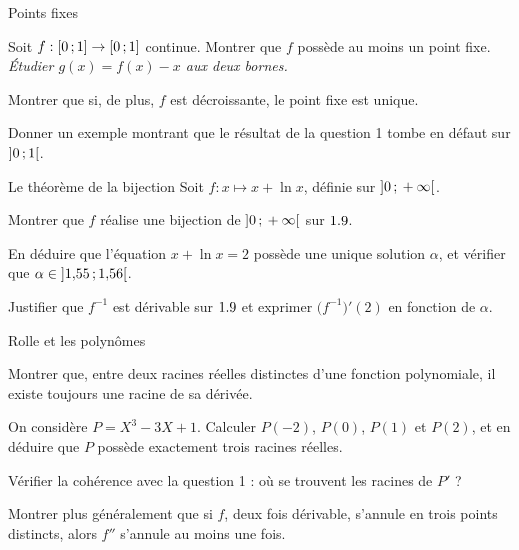\begin{exercice}[2]{Points fixes}
\begin{questions}
  \item Soit $f:\mathopen{[}0\,{;}\,1\mathclose{]}\to\mathopen{[}0\,{;}\,1\mathclose{]}$ continue. Montrer que $f$
    possède au moins un point fixe.
    \emph{Étudier $g(x)=f(x)-x$ aux deux bornes.}
  \item Montrer que si, de plus, $f$ est décroissante, le point fixe est
    unique.
  \item Donner un exemple montrant que le résultat de la question 1 tombe
    en défaut sur $\mathopen{]}0\,{;}\,1\mathclose{[}$.
\end{questions}
\end{exercice}

\begin{exercice}[2]{Le théorème de la bijection}
Soit $f:x\mapsto x+\ln x$, définie sur $\mathopen{]}0\,{;}\,+\infty\mathclose{[}$.
\begin{questions}
  \item Montrer que $f$ réalise une bijection de $\mathopen{]}0\,{;}\,+\infty\mathclose{[}$ sur
    $1.9$.
  \item En déduire que l'équation $x+\ln x=2$ possède une unique solution
    $\alpha$, et vérifier que $\alpha\in\mathopen{]}1{,}55\,{;}\,1{,}56\mathclose{[}$.
  \item Justifier que $f^{-1}$ est dérivable sur $1.9$ et exprimer
    $\bigl(f^{-1}\bigr)'(2)$ en fonction de $\alpha$.
\end{questions}
\end{exercice}

\begin{exercice}[2]{Rolle et les polynômes}
\begin{questions}
  \item Montrer que, entre deux racines réelles distinctes d'une fonction
    polynomiale, il existe toujours une racine de sa dérivée.
  \item On considère $P=X^{3}-3X+1$. Calculer $P(-2)$, $P(0)$, $P(1)$ et
    $P(2)$, et en déduire que $P$ possède exactement trois racines réelles.
  \item Vérifier la cohérence avec la question 1 : où se trouvent les
    racines de $P'$ ?
  \item Montrer plus généralement que si $f$, deux fois dérivable, s'annule
    en trois points distincts, alors $f''$ s'annule au moins une fois.
\end{questions}
\end{exercice}

